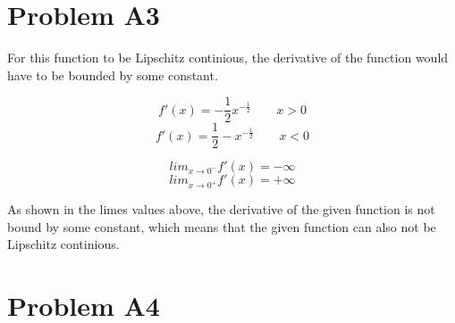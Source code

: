 \documentclass[12pt]{article}
\begin{document}
\section*{Problem A3}
For this function to be Lipschitz continious, the derivative of the function would have to be bounded by some constant.

$$f'(x) = -\frac{1}{2} x^{-\frac{1}{2}} \quad \quad x > 0$$
$$f'(x) = \frac{1}{2} -x^{-\frac{1}{2}} \quad \quad x < 0$$

$$lim_{x \rightarrow 0^-} f'(x) = -\infty$$
$$lim_{x \rightarrow 0^+} f'(x) = +\infty$$

As shown in the limes values above, the derivative of the given function is not bound by some constant, which means that the given function can also not be Lipschitz continious.

\section*{Problem A4}
\end{document}
